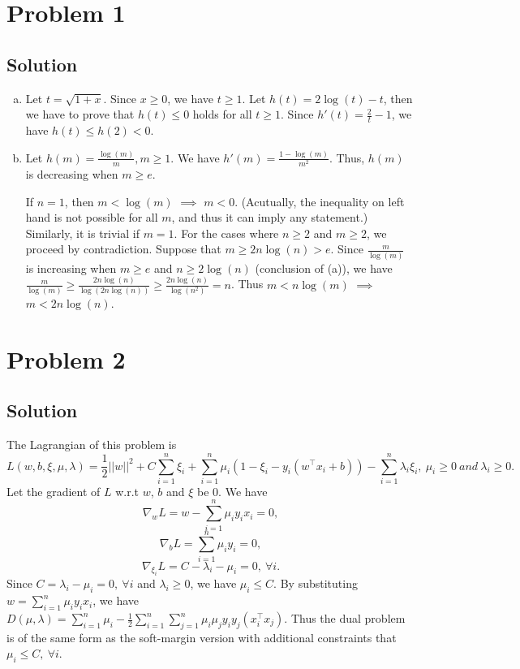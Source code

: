 \documentclass[11pt]{report}
\newcommand{\T}{\intercal}
\begin{document}

\section*{Problem 1}
\subsection*{Solution}
\begin{enumerate}[(a)]
\item Let $t = \sqrt{1+x}$. Since $x \geq 0$, we have $t \geq 1$. Let $h(t) = 2\log(t) - t$, then we have to prove that $h(t) \leq 0$ holds for all $t \geq 1$. Since $h'(t) = \frac{2}{t}-1$, we have $h(t) \leq h(2) < 0$.
\item Let $h(m) = \frac{\log(m)}{m}, m \geq 1$. We have $h'(m) = \frac{1-\log(m)}{m^2}$. Thus, $h(m)$ is decreasing when $m \geq e$.

If $n=1$, then $m < \log(m)$ $\implies$ $m<0$. (Acutually, the inequality on left hand is not possible for all $m$, and thus it can imply any statement.) Similarly, it is trivial if $m=1$. For the cases where $n \geq 2$ and $m \geq 2$, we proceed by contradiction. Suppose that $m \geq 2n\log(n) > e$. Since $\frac{m}{\log(m)}$ is increasing when $m \geq e$ and $n \geq 2\log(n)$ (conclusion of (a)), we have $\frac{m}{\log(m)} \geq \frac{2n\log(n)}{\log(2n\log(n))} \geq \frac{2n\log(n)}{\log(n^2)} = n$. Thus $m < n\log(m)$ $\implies$ $m < 2n\log(n)$.
\end{enumerate}
\section*{Problem 2}
\subsection*{Solution}
The Lagrangian of this problem is $$L(w, b, \xi, \mu, \lambda) = \frac{1}{2} ||w||^2 + C\sum_{i=1}^{n} \xi_i + \sum_{i=1}^{n} \mu_i(1-\xi_i-y_i(w^\T x_i+b)) - \sum_{i=1}^{n} \lambda_i \xi_i,~\mu_i \geq 0~and~\lambda_i \geq 0.$$
Let the gradient of $L$ w.r.t $w$, $b$ and $\xi$ be $0$. We have
$$\nabla_w L = w - \sum_{i=1}^{n} \mu_i y_i x_i = 0,$$
$$\nabla_b L = \sum_{i=1}^{n} \mu_i y_i = 0,$$
$$\nabla_{\xi_i} L = C - \lambda_i - \mu_i = 0,~\forall i.$$
Since $C = \lambda_i - \mu_i = 0,~\forall i$ and $\lambda_i \geq 0$, we have $\mu_i \leq C$.
By substituting $w = \sum_{i=1}^{n} \mu_i y_i x_i$, we have $D(\mu, \lambda) = \sum_{i=1}^{n} \mu_i - \frac{1}{2}\sum_{i=1}^{n}\sum_{j=1}^{n}\mu_i\mu_jy_iy_j(x_i^\T x_j)$. Thus the dual problem is of the same form as the soft-margin version with additional constraints that $\mu_i \leq C,~\forall i$.
\end{document}
